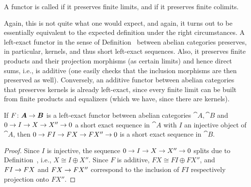 \documentclass[a4paper,parskip=half,numbers=enddot, DIV=12]{scrreprt}
\begin{document}
\begin{defi}
	A functor is called  if it preserves finite limits, and  if it preserves finite colimits.
\end{defi}
\begin{rem}
	Again, this is not quite what one would expect, and again, it turns out to be essentially equivalent to the expected definition under the right circumstances. A left-exact functor in the sense of Definition~ between abelian categories preserves, in particular, kernels, and thus short left-exact sequences. Also, it preserves finite products and their projection morphisms (as certain limits) and hence direct sums, i.e., is additive (one easily checks that the inclusion morphisms are then preserved as well). Conversely, an additive functor between abelian categories that preserves kernels is already left-exact, since every finite limit can be built from finite products and equalizers (which we have, since there are kernels).
\end{rem}
\begin{prop}
	If $F\colon {\cat A}\morphism{\cat B}$ is a left-exact functor between abelian categories ${\cat A},{\cat B}$ and $0\morphism I\morphism X\morphism X''\morphism 0$ a short exact sequence in ${\cat A}$ with $I$ an injective object of ${\cat A}$, then $0\morphism FI\morphism FX\morphism FX''\morphism 0$ is a short exact sequence in ${\cat B}$.
\end{prop}
\begin{proof}
	Since $I$ is injective, the sequence $0\morphism I\morphism X\morphism X''\morphism 0$ splits due to Definition~, i.e., $X\cong I\oplus X''$. Since $F$ is additive, $FX\cong FI\oplus FX''$, and $FI\morphism FX$ and $FX\morphism FX''$ correspond to the inclusion of $FI$ respectively projection onto $FX''$.
\end{proof}
\end{document}
